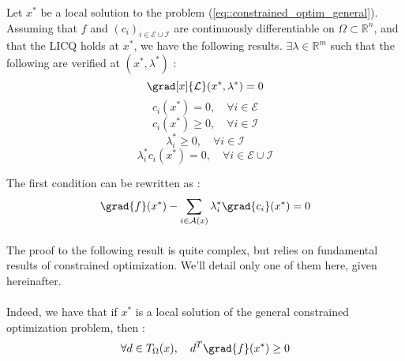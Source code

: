 \documentclass[a4paper]{article}
\begin{document}
{{			
			{
				Let $x^*$ be a local solution to the problem (\ref{eq::constrained_optim_general}). Assuming that $f$ and $(c_i)_{i\in\mathcal{E}\cup \mathcal{I}}$ are continuously differentiable on $\Omega\subset\mathbb{R}^n$, and that the LICQ holds at $x^*$, we have the following results. 
				\newline
				$\exists \lambda\in\mathbb{R}^m$ such that the following are verified at $(x^*,\lambda^*)$ :
				\begin{equation}
					\grad[x]{\mathcal{L}}(x^*,\lambda^*) = 0 				
				\end{equation}
				\begin{equation}
					c_i(x^*) = 0, \quad \forall i \in\mathcal{E}
				\end{equation}
				\begin{equation}
					c_i(x^*)\geq0, \quad \forall i\in\mathcal{I}
				\end{equation}
				\begin{equation}
					\lambda_i^*\geq 0, \quad \forall i \in \mathcal{I}
				\end{equation}
				\begin{equation}
					\lambda_i^*c_i(x^*) = 0, \quad \forall i\in\mathcal{E}\cup \mathcal{I}
				\end{equation}
			}
			
			\noindent The first condition can be rewritten as : 
			\begin{equation}
				\grad{f}(x^*) - \sum_{i\in\mathcal{A}(x)} \lambda_i^*\grad{c_i}(x^*) = 0
			\end{equation}
			
			\paragraph{} The proof to the following result is quite complex, but relies on fundamental results of constrained optimization. We'll detail only one of them here, given hereinafter. 
			
			\paragraph{} Indeed, we have that if $x^*$ is a local solution of the general constrained optimization problem, then : 
			\begin{equation}
				\forall d\in T_\Omega(x), \quad  d^T\grad{f}(x^*) \geq 0
			\end{equation}
			\vspace{10pt} 
			
}}
\end{document}
